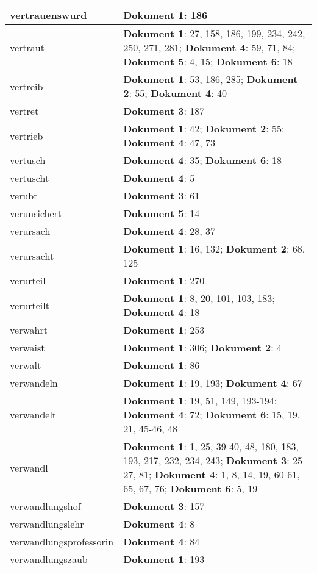 \documentclass[a5paper]{article}
\begin{document}
\begin{longtable}[l]{|l|p{3in}|}
\hline
vertrauenswurd & \textbf{Dokument 1}: 186 \\
\hline
vertraut & \textbf{Dokument 1}: 27, 158, 186, 199, 234, 242, 250, 271, 281; \textbf{Dokument 4}: 59, 71, 84; \textbf{Dokument 5}: 4, 15; \textbf{Dokument 6}: 18 \\
\hline
vertreib & \textbf{Dokument 1}: 53, 186, 285; \textbf{Dokument 2}: 55; \textbf{Dokument 4}: 40 \\
\hline
vertret & \textbf{Dokument 3}: 187 \\
\hline
vertrieb & \textbf{Dokument 1}: 42; \textbf{Dokument 2}: 55; \textbf{Dokument 4}: 47, 73 \\
\hline
vertusch & \textbf{Dokument 4}: 35; \textbf{Dokument 6}: 18 \\
\hline
vertuscht & \textbf{Dokument 4}: 5 \\
\hline
verubt & \textbf{Dokument 3}: 61 \\
\hline
verunsichert & \textbf{Dokument 5}: 14 \\
\hline
verursach & \textbf{Dokument 4}: 28, 37 \\
\hline
verursacht & \textbf{Dokument 1}: 16, 132; \textbf{Dokument 2}: 68, 125 \\
\hline
verurteil & \textbf{Dokument 1}: 270 \\
\hline
verurteilt & \textbf{Dokument 1}: 8, 20, 101, 103, 183; \textbf{Dokument 4}: 18 \\
\hline
verwahrt & \textbf{Dokument 1}: 253 \\
\hline
verwaist & \textbf{Dokument 1}: 306; \textbf{Dokument 2}: 4 \\
\hline
verwalt & \textbf{Dokument 1}: 86 \\
\hline
verwandeln & \textbf{Dokument 1}: 19, 193; \textbf{Dokument 4}: 67 \\
\hline
verwandelt & \textbf{Dokument 1}: 19, 51, 149, 193-194; \textbf{Dokument 4}: 72; \textbf{Dokument 6}: 15, 19, 21, 45-46, 48 \\
\hline
verwandl & \textbf{Dokument 1}: 1, 25, 39-40, 48, 180, 183, 193, 217, 232, 234, 243; \textbf{Dokument 3}: 25-27, 81; \textbf{Dokument 4}: 1, 8, 14, 19, 60-61, 65, 67, 76; \textbf{Dokument 6}: 5, 19 \\
\hline
verwandlungshof & \textbf{Dokument 3}: 157 \\
\hline
verwandlungslehr & \textbf{Dokument 4}: 8 \\
\hline
verwandlungsprofessorin & \textbf{Dokument 4}: 84 \\
\hline
verwandlungszaub & \textbf{Dokument 1}: 193 \\

\end{longtable}
\end{document}
